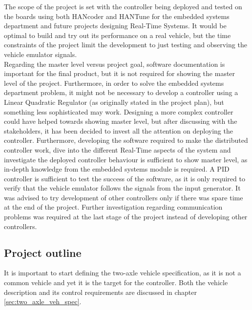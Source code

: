 \documentclass[table,xcdraw]{article}
\begin{document}
The scope of the project is set with the controller being deployed and tested on the boards using both HANcoder and HANTune for the embedded systems department and future projects designing Real-Time Systems. It would be optimal to build and try out its performance on a real vehicle, but the time constraints of the project limit the development to just testing and observing the vehicle emulator signals.\\

Regarding the master level versus project goal, software documentation is important for the final product, but it is not required for showing the master level of the project. Furthermore, in order to solve the embedded systems department problem, it might not be necessary to develop a controller using a Linear Quadratic Regulator (as originally stated in the project plan), but something less sophisticated may work. Designing a more complex controller could have helped towards showing master level, but after discussing with the stakeholders, it has been decided to invest all the attention on deploying the controller. Furthermore, developing the software required to make the distributed controller work, dive into the different Real-Time aspects of the system and investigate the deployed controller behaviour is sufficient to show master level, as in-depth knowledge from the embedded systems module is required. A PID controller is sufficient to test the success of the software, as it is only required to verify that the vehicle emulator follows the signals from the input generator. It was advised to try development of other controllers only if there was spare time at the end of the project. Further investigation regarding communication problems was required at the last stage of the project instead of developing other controllers.\\



\subsection{Project outline}

It is important to start defining the two-axle vehicle specification, as it is not a common vehicle and yet it is the target for the controller. Both the vehicle description and its control requirements are discussed in chapter \ref{sec:two_axle_veh_spec}.\\
\end{document}
